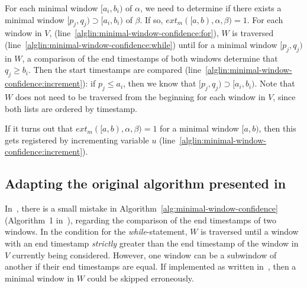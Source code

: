 For each minimal window $ [a_i, b_i) $ of $ \alpha $, we need to determine if there exists a minimal window $ [p_j, q_j) \supset [a_i, b_i) $ of $ \beta $. If so, $ ext_m([a, b), \alpha, \beta) = 1 $. For each window in $ V $, (line~\ref{alglin:minimal-window-confidence:for}), $ W $ is traversed (line~\ref{alglin:minimal-window-confidence:while}) until for a minimal window $ [p_j, q_j) $ in $ W $, a comparison of the end timestamps of both windows determine that $ q_j \geq b_i $. Then the start timestamps are compared (line~\ref{alglin:minimal-window-confidence:increment}): if $ p_j \leq a_i $, then we know that $ [p_j, q_j) \supset [a_i, b_i) $. Note that $ W $ does not need to be traversed from the beginning for each window in $ V $, since both lists are ordered by timestamp.

If it turns out that $ ext_m([a, b), \alpha, \beta) = 1 $ for a minimal window $ [a, b) $, then this gets registered by incrementing variable $ u $ (line~\ref{alglin:minimal-window-confidence:increment}).

\iffalse
\begin{figure}
\centering

\begin{tikzpicture}

\sequencetickmarks{15}{0}{0}

\foreach \x in {0,0.5,...,7}
    \draw [gray,ultra thin] (\x,2) -- (\x,-15pt);

\draw [very thick] (2.5,10pt) ++(0,-3pt) -- ++(0,3pt) -- ++(1.9,0) -- +(0,-3pt);
\windowthingy{(1,-5pt)}{5}
\windowthingy{(2,-10pt)}{6}

\end{tikzpicture}

\caption{Finding a minimal window of $ \beta $ that contains a given minimal window of $ \alpha $ (drawn above the sequence tick marks in bold).}
\label{fig:minimal-window-confidence}
\end{figure}
\fi

\subsection{Adapting the original algorithm presented in~\cite{cule2014marbles}}

In~\citep{cule2014marbles}, there is a small mistake in Algorithm~\ref{alg:minimal-window-confidence} (Algorithm~1 in~\citep{cule2014marbles}), regarding the comparison of the end timestamps of two windows. In the condition for the \emph{while}-statement, $ W $ is traversed until a window with an end timestamp \emph{strictly} greater than the end timestamp of the window in $ V $ currently being considered. However, one window can be a subwindow of another if their end timestamps are equal. If implemented as written in~\cite{cule2014marbles}, then a minimal window in $ W $ could be skipped erroneously.



